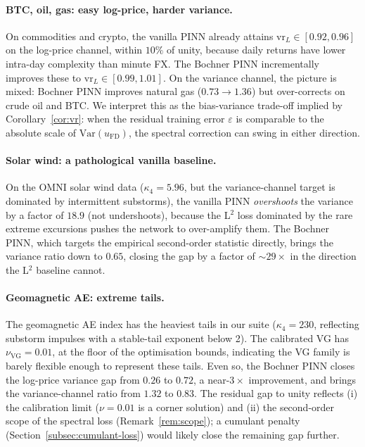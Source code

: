 \documentclass[review,12pt]{elsarticle}
\begin{document}
\paragraph{BTC, oil, gas: easy log-price, harder variance.}
On commodities and crypto, the vanilla PINN already attains
\(\mathrm{vr}_L \in [0.92, 0.96]\) on the log-price channel,
within \(10\%\) of unity, because daily returns have lower
intra-day complexity than minute FX. The Bochner PINN incrementally
improves these to \(\mathrm{vr}_L \in [0.99, 1.01]\). On the variance
channel, the picture is mixed: Bochner PINN improves natural gas
(\(0.73 \to 1.36\)) but over-corrects on crude oil and BTC. We
interpret this as the bias-variance trade-off implied by
Corollary~\ref{cor:vr}: when the residual training error
\(\varepsilon\) is comparable to the absolute scale of
\(\mathrm{Var}(u_{\mathrm{FD}})\), the spectral correction can swing
in either direction.

\paragraph{Solar wind: a pathological vanilla baseline.}
On the OMNI solar wind data (\(\kappa_4 = 5.96\), but the
variance-channel target is dominated by intermittent substorms), the
vanilla PINN \emph{overshoots} the variance by a factor of \(18.9\)
(not undershoots), because the L\(^2\) loss dominated by the rare
extreme excursions pushes the network to over-amplify them. The
Bochner PINN, which targets the empirical second-order statistic
directly, brings the variance ratio down to \(0.65\), closing the
gap by a factor of \(\sim 29\times\) in the direction the L\(^2\)
baseline cannot.

\paragraph{Geomagnetic AE: extreme tails.}
The geomagnetic AE index has the heaviest tails in our suite
(\(\kappa_4 = 230\), reflecting substorm impulses with a stable-tail
exponent below 2). The calibrated VG has
\(\nu_{\mathrm{VG}} = 0.01\), at the floor of the optimisation
bounds, indicating the VG family is barely flexible enough to
represent these tails. Even so, the Bochner PINN closes the
log-price variance gap from \(0.26\) to \(0.72\), a near-\(3\times\)
improvement, and brings the variance-channel ratio from \(1.32\) to
\(0.83\). The residual gap to unity reflects (i) the calibration
limit (\(\nu = 0.01\) is a corner solution) and (ii) the
second-order scope of the spectral loss
(Remark~\ref{rem:scope}); a cumulant penalty
(Section~\ref{subsec:cumulant-loss}) would likely close the
remaining gap further.
\end{document}
